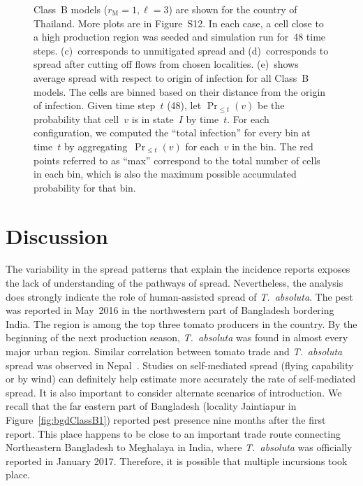 \documentclass[11pt]{article}
\newcommand{\tuta}{\emph{T.~absoluta}}
\newcommand{\mooreRange}{r_\mathrm{M}}
\theoremstyle{definition}
\begin{document}
\begin{figure}[ht]
{Class~B models ($\mooreRange=1, \ell=3$) are shown for the country of
Thailand. More plots are in Figure~S12. In each case, a
cell close to a high production region was seeded and simulation run for~48
time steps. (c)~corresponds to unmitigated spread and (d)~corresponds to
spread after cutting off flows from chosen localities. (e)~shows average
spread with respect to origin of infection for all Class~B models. The
cells are binned based on their distance from the origin of infection.
Given time step~$t$ (48), let $\Pr_{\le t}(v)$ be the probability that
cell~$v$ is in state~$I$ by time~$t$. For each configuration, we computed
the ``total infection'' for every bin at time~$t$ by aggregating~$\Pr_{\le
t}(v)$ for each~$v$ in the bin. The red points referred to as ``max''
correspond to the total number of cells in each bin, which is also the
maximum possible accumulated probability for that bin.
\label{fig:spread}}
\end{figure}

\section{Discussion}
The variability in the spread patterns that explain the incidence reports
exposes the lack of understanding of the pathways of spread.  Nevertheless,
the analysis does strongly indicate the role of human-assisted spread of
\tuta{}. The pest was reported in May~2016 in the northwestern part of
Bangladesh bordering India. The region is among the top three tomato
producers in the country. By the beginning of the next production season,
\tuta{} was found in almost every major urban region.  Similar correlation
between tomato trade and \tuta{} spread was observed in
Nepal~\cite{venkatramanan2019modeling}. Studies on self-mediated spread
(flying capability or by wind) can definitely help estimate more accurately
the rate of self-mediated spread. It is also important to consider
alternate scenarios of introduction. We recall that the far eastern part of
Bangladesh (locality Jaintiapur in Figure~\ref{fig:bgdClassB1}) reported
pest presence nine months after the first report. This place happens to be
close to an important trade route connecting Northeastern Bangladesh to
Meghalaya in India, where \tuta{} was officially reported in January 2017.
Therefore, it is possible that multiple incursions took place. 
\end{document}
